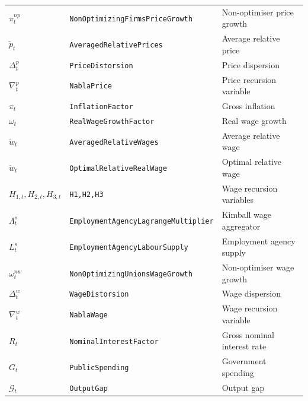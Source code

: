 \documentclass[11pt,a4paper]{article}
\begin{document}
\begin{center}
\begin{tabular}{lll}
$\pi^{np}_t$  & \texttt{NonOptimizingFirmsPriceGrowth} & Non-optimiser price growth \\
$\tilde p_t$  & \texttt{AveragedRelativePrices} & Average relative price \\
$\Delta^p_t$  & \texttt{PriceDistorsion}        & Price dispersion \\
$\nabla^p_t$  & \texttt{NablaPrice}             & Price recursion variable \\
$\pi_t$       & \texttt{InflationFactor}         & Gross inflation \\
\midrule
$\omega_t$    & \texttt{RealWageGrowthFactor}   & Real wage growth \\
$\tilde w_t$  & \texttt{AveragedRelativeWages}  & Average relative wage \\
$\breve w_t$       & \texttt{OptimalRelativeRealWage} & Optimal relative wage \\
$H_{1,t},H_{2,t},H_{3,t}$ & \texttt{H1,H2,H3}  & Wage recursion variables \\
$\Lambda^s_t$ & \texttt{EmploymentAgencyLagrangeMultiplier} & Kimball wage aggregator \\
$L^s_t$       & \texttt{EmploymentAgencyLabourSupply} & Employment agency supply \\
$\omega^{nw}_t$ & \texttt{NonOptimizingUnionsWageGrowth} & Non-optimiser wage growth \\
$\Delta^w_t$  & \texttt{WageDistorsion}         & Wage dispersion \\
$\nabla^w_t$  & \texttt{NablaWage}              & Wage recursion variable \\
\midrule
$R_t$         & \texttt{NominalInterestFactor}  & Gross nominal interest rate \\
$G_t$         & \texttt{PublicSpending}          & Government spending \\
$\mathcal{G}_t$ & \texttt{OutputGap}            & Output gap \\
\bottomrule
\end{tabular}
\end{center}

\medskip
\end{document}
